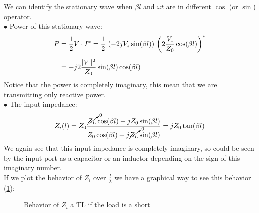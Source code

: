 We can identify the stationary wave when $\beta l$ and $\omega t$ are in different $\cos$ (or $\sin$) operator.\\
$\bullet$ Power of this stationary wave:
\begin{align}
    \begin{split}
      P&=\frac{1}{2}V\cdot I^{*}=\frac{1}{2}\,\left(-2jV\bottomPlus \sin(\beta l)\right)\,\left(2\frac{V\bottomPlus}{Z_0}\cos(\beta l)\right)^*\\[5pt]
      &=-j2\frac{|V\bottomPlus|^2}{Z_0}\sin(\beta l)\cos(\beta l)
    \end{split}
\end{align}
Notice that the power is completely imaginary, this mean that we are transmitting only reactive power.\\
$\bullet$ The input impedance:
\begin{equation}
    Z_i(l)=Z_0\frac{\cancelto{0}{Z_L}\cos(\beta l)+jZ_0 \sin(\beta l)}{Z_0\cos(\beta l)+j\cancelto{0}{Z_L}\sin(\beta l)}=jZ_0\tan(\beta l)
\end{equation}
We again see that this input impedance is completely imaginary, so could be seen by the input port as a capacitor or an inductor depending on the sign of this imaginary number.\\
If we plot the behavior of $Z_i$ over $\frac{l}{\lambda}$ we have a graphical way to see this behavior (\cref{fig:behavior_of_short_in_TL}):
\begin{figure}[H]
    \begin{center}
    \end{center}
    \caption{Behavior of $Z_i$ a TL if the load is a short}\label{fig:behavior_of_short_in_TL}
\end{figure}

